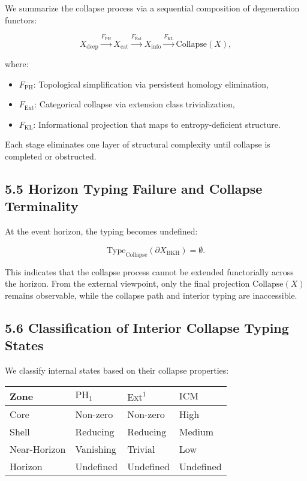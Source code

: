 \documentclass[11pt]{article}
\begin{document}
We summarize the collapse process via a sequential composition of degeneration functors:

\[
X_{\mathrm{deep}} \xrightarrow{F_{\mathrm{PH}}}
X_{\mathrm{cat}} \xrightarrow{F_{\mathrm{Ext}}}
X_{\mathrm{info}} \xrightarrow{F_{\mathrm{KL}}}
\mathrm{Collapse}(X),
\]

where:

\begin{itemize}
    \item \( F_{\mathrm{PH}} \): Topological simplification via persistent homology elimination,
    \item \( F_{\mathrm{Ext}} \): Categorical collapse via extension class trivialization,
    \item \( F_{\mathrm{KL}} \): Informational projection that maps to entropy-deficient structure.
\end{itemize}

Each stage eliminates one layer of structural complexity until collapse is completed or obstructed.

\subsection*{5.5 Horizon Typing Failure and Collapse Terminality}

At the event horizon, the typing becomes undefined:

\[
\mathrm{Type}_{\mathrm{Collapse}}(\partial X_{\mathrm{BKH}}) = \emptyset.
\]

This indicates that the collapse process cannot be extended functorially across the horizon. From the external viewpoint, only the final projection \( \mathrm{Collapse}(X) \) remains observable, while the collapse path and interior typing are inaccessible.

\subsection*{5.6 Classification of Interior Collapse Typing States}

We classify internal states based on their collapse properties:

\begin{center}
\begin{tabular}{llll}
\toprule
\textbf{Zone} & \textbf{\( \mathrm{PH}_1 \)} & \textbf{\( \mathrm{Ext}^1 \)} & \textbf{\( \mathrm{ICM} \)} \\
\midrule
Core & Non-zero & Non-zero & High \\
Shell & Reducing & Reducing & Medium \\
Near-Horizon & Vanishing & Trivial & Low \\
Horizon & Undefined & Undefined & Undefined \\
\bottomrule
\end{tabular}
\end{center}
\end{document}
